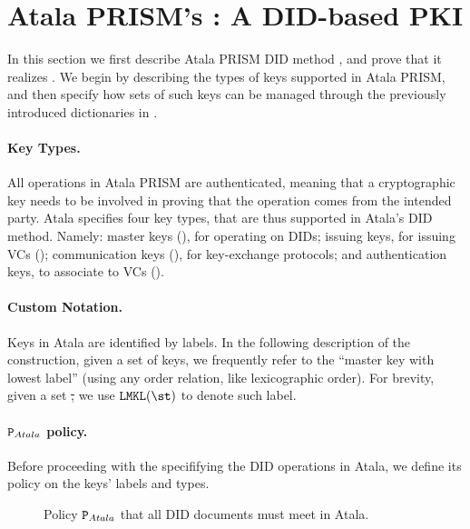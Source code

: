 \section{Atala PRISM's \RealPKIDIDAtala: A DID-based PKI}
\label{sec:did-atala}

In this section we first describe Atala PRISM DID method \RealPKIDIDAtala, and
prove that it realizes \IdealGPKIDID.
%
We begin by describing the types of keys supported in Atala PRISM, and then
specify how sets of such keys can be managed through the previously introduced
dictionaries in \IdealGPKIDID.

\paragraph{Key Types.} %
All operations in Atala PRISM are authenticated, meaning that a cryptographic
key needs to be involved in proving that the operation comes from the intended
party. Atala specifies four key types, that are thus supported in Atala's DID
method. Namely: master keys (\MasterKey), for operating on DIDs; issuing keys,
for issuing VCs (\IssueKey); communication keys (\CommKey), for key-exchange
protocols; and authentication keys, to associate to VCs (\AuthKey).

\paragraph{Custom Notation.} %
Keys in Atala are identified by labels. In the following description of the
\RealPKIDIDAtala construction, given a set of keys, we frequently refer to the
``master key with lowest label'' (using any order relation, like lexicographic
order).  For brevity, given a set \st, we use $\LMKL(\st)$ to denote such label.

\paragraph{$\P_{Atala}$ policy.} %
Before proceeding with the specififying the DID operations in Atala, we define
its policy on the keys' labels and types.

\begin{figure}[ht]
  \centering
  \caption{Policy $\P_{Atala}$ that all DID documents must meet in Atala.}
\end{figure}

